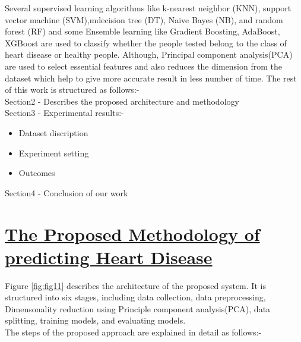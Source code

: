 \documentclass[11pt]{article}
\begin{document}
Several supervised learning algorithms like k-nearest neighbor (KNN), support vector machine (SVM),mdecision tree (DT), Naive Bayes (NB), and random forest
(RF) and some Ensemble learning like Gradient Boosting, AdaBoost, XGBoost  are used to classify whether the people tested belong to the class of heart disease or healthy people. Although, Principal component analysis(PCA) are used to select essential features and also reduces the dimension from the dataset which help to give more accurate result in less number of time.
The rest of this work is structured as follows:-\\
Section2 - Describes the proposed architecture and methodology\\
Section3 - Experimental results:-\\
\vspace{0cm}
\begin{itemize}
\vspace{-1.3cm}
\item Dataset discription
\vspace{-0.5cm}
\item Experiment setting
\vspace{-0.5cm}
\item Outcomes
\end{itemize}
 Section4 - Conclusion of our work
\section{\underline{The Proposed Methodology of predicting Heart Disease}}

 Figure \ref{fig:fig11} describes the architecture of the proposed system. It is structured into six stages, including data collection, data preprocessing, Dimensonality reduction using Principle component analysis(PCA), data splitting, training models, and evaluating models.\\
 The steps of the proposed approach are explained in
detail as follows:-
\end{document}
